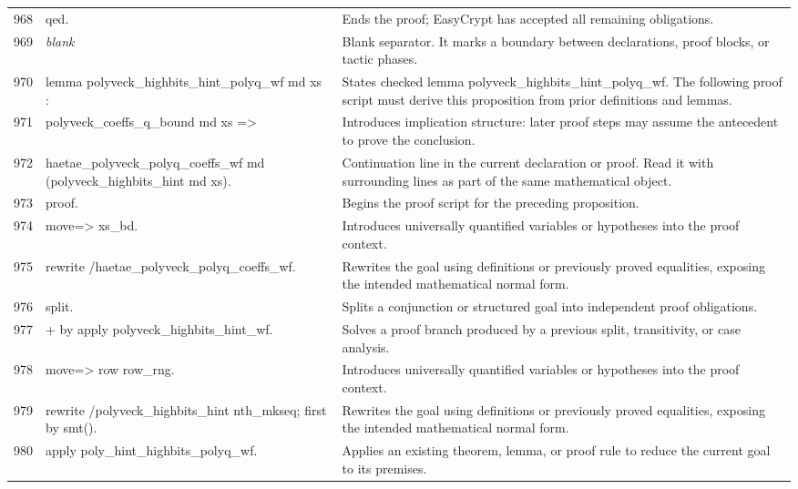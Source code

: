 \documentclass[10pt]{article}
\begin{document}
\begin{longtable}{r L{0.53\textwidth} L{0.37\textwidth}}
968 & {\ttfamily\scriptsize qed.} & Ends the proof; EasyCrypt has accepted all remaining obligations. \\
969 & {\ttfamily\scriptsize \emph{blank}} & Blank separator.  It marks a boundary between declarations, proof blocks, or tactic phases. \\
970 & {\ttfamily\scriptsize lemma polyveck\_highbits\_hint\_polyq\_wf md xs :} & States checked lemma polyveck\_highbits\_hint\_polyq\_wf.  The following proof script must derive this proposition from prior definitions and lemmas. \\
971 & {\ttfamily\scriptsize   polyveck\_coeffs\_q\_bound md xs =>} & Introduces implication structure: later proof steps may assume the antecedent to prove the conclusion. \\
972 & {\ttfamily\scriptsize   haetae\_polyveck\_polyq\_coeffs\_wf md (polyveck\_highbits\_hint md xs).} & Continuation line in the current declaration or proof.  Read it with surrounding lines as part of the same mathematical object. \\
973 & {\ttfamily\scriptsize proof.} & Begins the proof script for the preceding proposition. \\
974 & {\ttfamily\scriptsize move=> xs\_bd.} & Introduces universally quantified variables or hypotheses into the proof context. \\
975 & {\ttfamily\scriptsize rewrite /haetae\_polyveck\_polyq\_coeffs\_wf.} & Rewrites the goal using definitions or previously proved equalities, exposing the intended mathematical normal form. \\
976 & {\ttfamily\scriptsize split.} & Splits a conjunction or structured goal into independent proof obligations. \\
977 & {\ttfamily\scriptsize + by apply polyveck\_highbits\_hint\_wf.} & Solves a proof branch produced by a previous split, transitivity, or case analysis. \\
978 & {\ttfamily\scriptsize move=> row row\_rng.} & Introduces universally quantified variables or hypotheses into the proof context. \\
979 & {\ttfamily\scriptsize rewrite /polyveck\_highbits\_hint nth\_mkseq; first by smt().} & Rewrites the goal using definitions or previously proved equalities, exposing the intended mathematical normal form. \\
980 & {\ttfamily\scriptsize apply poly\_hint\_highbits\_polyq\_wf.} & Applies an existing theorem, lemma, or proof rule to reduce the current goal to its premises. \\

\end{longtable}
\end{document}

